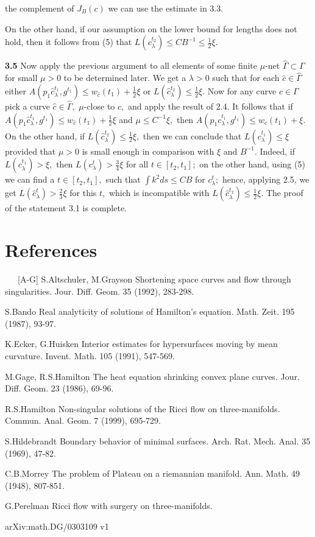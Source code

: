 \documentclass{article}
\newcommand{\la}{\lambda}
\newcommand{\G}{\Gamma}
\begin{document}
the complement of $J_B(c)$ we can use the estimate in 3.3.
\par On the other hand, if our assumption on the lower bound for
lengths does not hold, then it follows from (5) that
$L(c^{t_2}_{\la})\le CB^{-1}\le\frac{1}{2}\xi.$
\par {\bf 3.5} Now apply   the previous argument to all elements
of some finite $\mu$-net $\hat{\G}\subset \G$ for small $\mu>0$ to
be determined later. We get a $\la>0$ such that for each
$\hat{c}\in\hat{\G}$ either $A(p_1\hat{c}_{\la}^{t_1},g^{t_1})\le
w_{\hat{c}}(t_1)+\frac{1}{2}\xi$ or $L(\hat{c}_{\la}^{t_2})\le
\frac{1}{2}\xi.$ Now for any curve $c\in\G$ pick a curve
$\hat{c}\in\hat{\G},$ $\mu$-close to $c,$ and apply the result of
2.4. It follows that if $A(p_1\hat{c}_{\la}^{t_1},g^{t_1})\le
w_{\hat{c}}(t_1)+\frac{1}{2}\xi$ and $\mu \le C^{-1}\xi,$ then
$A(p_1c_{\la}^{t_1},g^{t_1})\le w_c(t_1)+\xi.$ On the other hand,
if $L(\hat{c}_{\la}^{t_2})\le \frac{1}{2}\xi,$ then we can
conclude that $L(c_{\la}^{t_1})\le \xi$ provided that $\mu>0$ is
small enough in comparison with $\xi$ and $B^{-1}.$ Indeed, if
$L(c_{\la}^{t_1})>\xi,$ then $L(c_{\la}^t)>\frac{3}{4}\xi$ for all
$t\in [t_2,t_1];$ on the other hand, using (5) we can find a $t\in
[t_2,t_1],$ such that $\int k^2ds \le CB$ for $c^t_{\la};$ hence,
applying 2.5, we get $L(\hat{c}_{\la}^t)>\frac{2}{3}\xi$ for this
$t,$ which is incompatible with $L(\hat{c}_{\la}^{t_2})\le
\frac{1}{2}\xi.$ The proof of the statement 3.1 is complete.
\section*{References}
\ \ \ [A-G] S.Altschuler, M.Grayson Shortening space curves and
flow through singularities. Jour. Diff. Geom. 35 (1992), 283-298.
\par [B] S.Bando Real analyticity of solutions of Hamilton's
equation. Math. Zeit. 195 (1987), 93-97.
\par [E-Hu] K.Ecker, G.Huisken Interior estimates for
hypersurfaces moving by mean curvature. Invent. Math. 105 (1991),
547-569.
\par [G-H] M.Gage, R.S.Hamilton The heat equation shrinking convex
plane curves. Jour. Diff. Geom. 23 (1986), 69-96.
\par [H] R.S.Hamilton Non-singular solutions of the Ricci flow on
three-manifolds. Commun. Anal. Geom. 7 (1999), 695-729.
\par [Hi] S.Hildebrandt Boundary behavior of minimal surfaces.
Arch. Rat. Mech. Anal. 35 (1969), 47-82.
\par [M] C.B.Morrey The problem of Plateau on a riemannian
manifold. Ann. Math. 49 (1948), 807-851.
\par [P] G.Perelman Ricci flow with surgery on three-manifolds. \par arXiv:math.DG/0303109 v1
\end{document}
